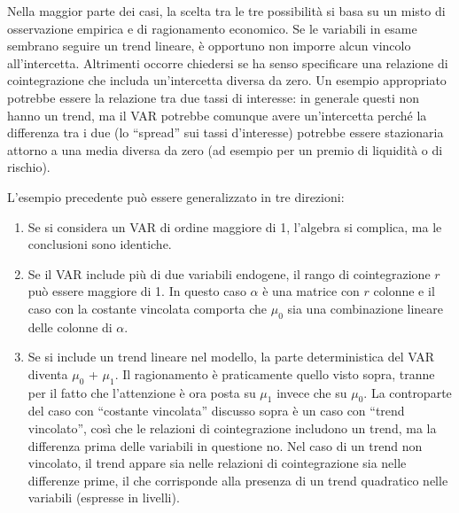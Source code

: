 Nella maggior parte dei casi, la scelta tra le tre possibilità si basa
su un misto di osservazione empirica e di ragionamento economico. Se
le variabili in esame sembrano seguire un trend lineare, è opportuno
non imporre alcun vincolo all'intercetta. Altrimenti occorre chiedersi
se ha senso specificare una relazione di cointegrazione che includa
un'intercetta diversa da zero. Un esempio appropriato potrebbe essere
la relazione tra due tassi di interesse: in generale questi non hanno
un trend, ma il VAR potrebbe comunque avere un'intercetta perché la
differenza tra i due (lo ``spread'' sui tassi d'interesse) potrebbe
essere stazionaria attorno a una media diversa da zero (ad esempio per
un premio di liquidità o di rischio).
    
L'esempio precedente può essere generalizzato in tre direzioni:
    
\begin{enumerate}
\item Se si considera un VAR di ordine maggiore di 1, l'algebra si
  complica, ma le conclusioni sono identiche.
\item Se il VAR include più di due variabili endogene, il rango di
  cointegrazione $r$ può essere maggiore di 1. In questo caso $\alpha$
  è una matrice con $r$ colonne e il caso con la costante vincolata
  comporta che $\mu_0$ sia una combinazione lineare delle colonne di
  $\alpha$.
\item Se si include un trend lineare nel modello, la parte
  deterministica del VAR diventa $\mu_0$ + $\mu_1$. Il ragionamento è
  praticamente quello visto sopra, tranne per il fatto che
  l'attenzione è ora posta su $\mu_1$ invece che su $\mu_0$. La
  controparte del caso con ``costante vincolata'' discusso sopra è un
  caso con ``trend vincolato'', così che le relazioni di
  cointegrazione includono un trend, ma la differenza prima delle
  variabili in questione no. Nel caso di un trend non vincolato, il
  trend appare sia nelle relazioni di cointegrazione sia nelle
  differenze prime, il che corrisponde alla presenza di un trend
  quadratico nelle variabili (espresse in livelli).
\end{enumerate}

